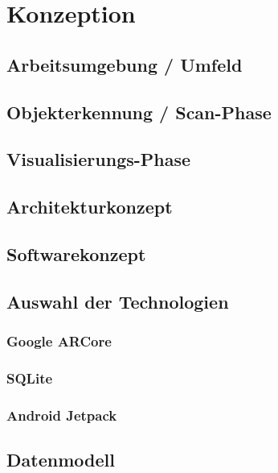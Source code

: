 
\chapter{Konzeption}
\section{Arbeitsumgebung / Umfeld}

\section{Objekterkennung / Scan-Phase}
\section{Visualisierungs-Phase}

\section{Architekturkonzept}
\section{Softwarekonzept}

\section{Auswahl der Technologien}
\subsection{Google ARCore}
\subsection{SQLite}
\subsection{Android Jetpack} 

\section{Datenmodell}